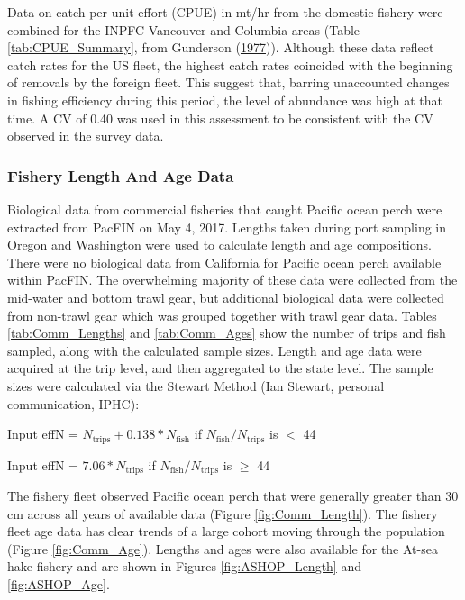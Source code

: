 \documentclass[12pt,]{article}
\begin{document}
Data on catch-per-unit-effort (CPUE) in mt/hr from the domestic fishery
were combined for the INPFC Vancouver and Columbia areas (Table
\ref{tab:CPUE_Summary}, from Gunderson
(\protect\hyperlink{ref-gunderson_population_1977}{1977})). Although
these data reflect catch rates for the US fleet, the highest catch rates
coincided with the beginning of removals by the foreign fleet. This
suggest that, barring unaccounted changes in fishing efficiency during
this period, the level of abundance was high at that time. A CV of 0.40
was used in this assessment to be consistent with the CV observed in the
survey data.

\subsubsection{Fishery Length And Age
Data}\label{fishery-length-and-age-data}

Biological data from commercial fisheries that caught Pacific ocean
perch were extracted from PacFIN on May 4, 2017. Lengths taken during
port sampling in Oregon and Washington were used to calculate length and
age compositions. There were no biological data from California for
Pacific ocean perch available within PacFIN. The overwhelming majority
of these data were collected from the mid-water and bottom trawl gear,
but additional biological data were collected from non-trawl gear which
was grouped together with trawl gear data. Tables \ref{tab:Comm_Lengths}
and \ref{tab:Comm_Ages} show the number of trips and fish sampled, along
with the calculated sample sizes. Length and age data were acquired at
the trip level, and then aggregated to the state level. The sample sizes
were calculated via the Stewart Method (Ian Stewart, personal
communication, IPHC):

\begin{centering}

Input effN = $N_{\text{trips}} + 0.138 * N_{\text{fish}}$ if $N_{\text{fish}}/N_{\text{trips}}$ is $<$ 44

Input effN = $7.06 * N_{\text{trips}}$ if $N_{\text{fish}}/N_{\text{trips}}$ is $\geq$ 44

\end{centering}

The fishery fleet observed Pacific ocean perch that were generally
greater than 30 cm across all years of available data (Figure
\ref{fig:Comm_Length}). The fishery fleet age data has clear trends of a
large cohort moving through the population (Figure \ref{fig:Comm_Age}).
Lengths and ages were also available for the At-sea hake fishery and are
shown in Figures \ref{fig:ASHOP_Length} and \ref{fig:ASHOP_Age}.
\end{document}

